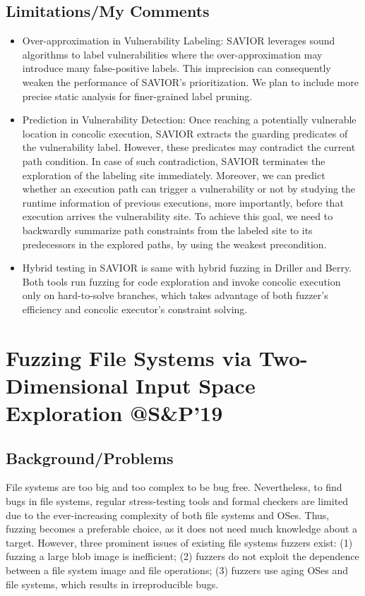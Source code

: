 \documentclass[]{article} %
\begin{document}
\subsection{Limitations/My Comments}
\begin{itemize}
    \item Over-approximation in Vulnerability Labeling: SAVIOR leverages sound algorithms
to label vulnerabilities where the over-approximation may
introduce many false-positive labels. This imprecision can
consequently weaken the performance of SAVIOR's prioritization. 
We plan to include more precise
static analysis for finer-grained label pruning.
    \item Prediction in Vulnerability Detection: Once reaching a
potentially vulnerable location in concolic execution,
SAVIOR extracts the guarding predicates of the vulnerability
label. However, these predicates may contradict the current
path condition. In case of such contradiction, SAVIOR terminates
the exploration of the labeling site immediately.
Moreover, we can predict whether an execution
path can trigger a vulnerability or not by studying the
runtime information of previous executions, more importantly,
before that execution arrives the vulnerability site. To
achieve this goal, we need to backwardly summarize
path constraints from the labeled site to its predecessors in
the explored paths, by using the weakest precondition.
    \item Hybrid testing in SAVIOR is same with hybrid fuzzing in Driller and Berry. Both tools run fuzzing for code exploration and invoke concolic execution only on
hard-to-solve branches, which takes advantage of both fuzzer's
efficiency and concolic executor's constraint solving.
\end{itemize}
\newpage
\section{Fuzzing File Systems via Two-Dimensional Input Space Exploration @S\&P'19}
\subsection{Background/Problems}
File systems are too big and too complex to be bug free. Nevertheless, to find bugs in file systems, regular stress-testing tools and formal checkers are limited due to the ever-increasing complexity of both file systems and OSes. Thus, fuzzing becomes a preferable choice, as it does not need much knowledge about a target. However,
three prominent issues of existing file systems fuzzers exist: 
(1) fuzzing a large blob image is inefficient; 
(2) fuzzers do not exploit the dependence
between a file system image and file operations; 
(3) fuzzers use aging OSes and file systems, which results in
irreproducible bugs.
\end{document}
